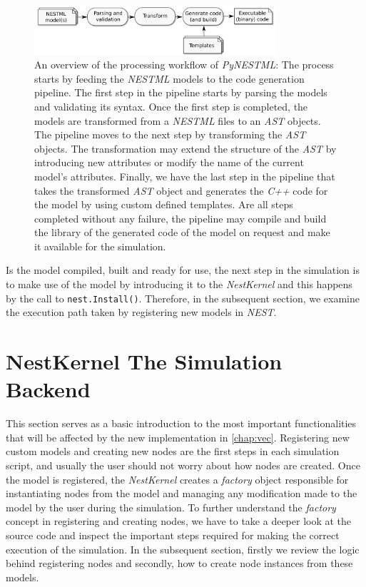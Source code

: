 \begin{figure}[ht!]
\centering
\includegraphics[width=0.8\textwidth]{src/pic/internal_workflow.png}
\caption{An overview of the processing workflow of \emph{PyNESTML}: The process starts by feeding the \emph{NESTML} models to the code generation pipeline. The first step in the pipeline starts by parsing the models and validating its syntax. Once the first step is completed, the models are transformed from a \emph{NESTML} files to an \emph{AST} objects. The pipeline moves to the next step by transforming the \emph{AST} objects. The transformation may extend the structure of the \emph{AST} by introducing new attributes or modify the name of the current model's attributes. Finally, we have the last step in the pipeline that takes the transformed \emph{AST} object and generates the \emph{C++} code for the model by using custom defined templates. Are all steps completed without any failure, the pipeline may compile and build the library of the generated code of the model on request and make it available for the simulation.}
\label{fig:pynestml_workflow}
\end{figure}



Is the model compiled, built and ready for use, the next step in the simulation is to make use of the model by introducing it to the \emph{NestKernel} and this happens by the call to \texttt{nest.Install()}. Therefore, in the subsequent section, we examine the execution path taken by registering new models in \emph{NEST}.

\section{NestKernel The Simulation Backend}


This section serves as a basic introduction to the most important functionalities that will be affected by the new implementation in \autoref{chap:vec}. Registering new custom models and creating new nodes are the first steps in each simulation script, and usually the user should not worry about how nodes are created. Once the model is registered, the \emph{NestKernel} creates a \emph{factory} object responsible for instantiating nodes from the model and managing any modification made to the model by the user during the simulation. To further understand the \emph{factory} concept in registering and creating nodes, we have to take a deeper look at the source code and inspect the important steps required for making the correct execution of the simulation. In the subsequent section, firstly we review the logic behind registering nodes and secondly, how to create node instances from these models.

